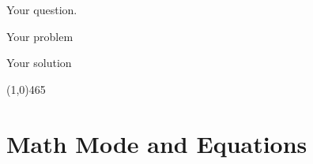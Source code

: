 \documentclass[12pt]{article}
\newenvironment{problem}[2][Problem]
{\begin{trivlist}
\item[\hskip \labelsep {\bfseries #1}\hskip \labelsep {\bfseries #2.}]}{\end{trivlist}}
\newenvironment{question}[2][Question]
{\begin{trivlist}
\item[\hskip \labelsep {\bfseries #1}\hskip \labelsep {\bfseries #2.}]}{\end{trivlist}}
\newenvironment{solution}[2][\underline{Solution}]
{\begin{trivlist}
\item[\hskip \labelsep {\bfseries #1}\hskip \labelsep {\bfseries #2}]}{\end{trivlist}}
\newenvironment{tightcenter}{%
  \setlength\topsep{0pt}
  \setlength\parskip{0pt}
  \begin{center}
}{%
  \end{center}
}
\begin{document}
\begin{question}{1}
Your question.
\end{question}

\begin{problem}{4} \text{} \newline
Your problem
\end{problem}

\begin{solution}{(15)}
Your solution
\end{solution}


\begin{tightcenter}
\line(1,0){465}
\end{tightcenter}

\newpage


\section*{Math Mode and Equations}

\end{document}
